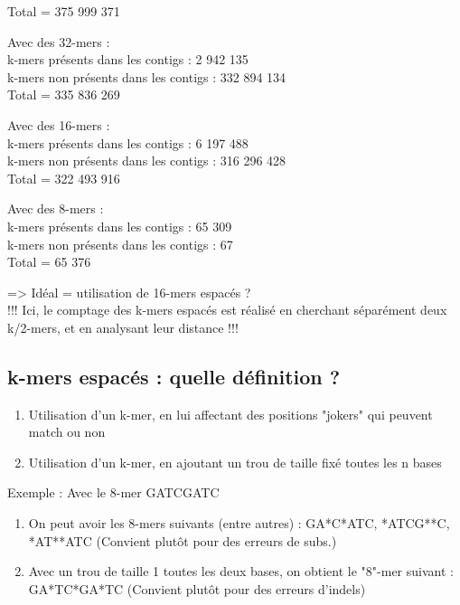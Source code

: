 \documentclass[12pt]{article}
\begin{document}
Total = 375 999 371

Avec des 32-mers : \\

k-mers présents dans les contigs : 2 942 135 \\
k-mers non présents dans les contigs : 332 894 134 \\

Total = 335 836 269 

Avec des 16-mers : \\

k-mers présents dans les contigs : 6 197 488 \\
k-mers non présents dans les contigs : 316 296 428 \\

Total = 322 493 916

Avec des 8-mers : \\

k-mers présents dans les contigs : 65 309 \\
k-mers non présents dans les contigs : 67 \\

Total = 65 376

=> Idéal = utilisation de 16-mers espacés ? \\

!!! Ici, le comptage des k-mers espacés est réalisé en cherchant séparément deux k/2-mers, et en analysant leur distance !!!


\subsection{k-mers espacés : quelle définition ?}

\begin{enumerate}
	\item Utilisation d'un k-mer, en lui affectant des positions "jokers" qui peuvent match ou non 
	
	\item Utilisation d'un k-mer, en ajoutant un trou de taille fixé toutes les n bases
\end{enumerate}

Exemple : Avec le 8-mer GATCGATC \\

\begin{enumerate}
	\item On peut avoir les 8-mers suivants (entre autres) : GA*C*ATC, *ATCG**C, *AT**ATC (Convient plutôt pour des erreurs de subs.)
	
	\item Avec un trou de taille 1 toutes les deux bases, on obtient le "8"-mer suivant : GA*TC*GA*TC (Convient plutôt pour des erreurs d'indels)
\end{enumerate}
\end{document}
